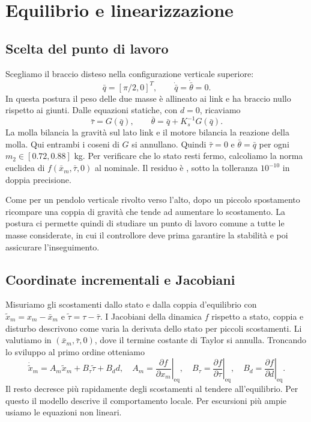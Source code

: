 \chapter{Equilibrio e linearizzazione}
\section{Scelta del punto di lavoro}
Scegliamo il braccio disteso nella configurazione verticale superiore:
\[
 \bar q=[\pi/2,0]^T,\qquad \dot{\bar q}=\dot{\bar\theta}=0.
\]
In questa postura il peso delle due masse è allineato ai link e ha
braccio nullo rispetto ai giunti. Dalle equazioni statiche, con
$d=0$, ricaviamo
\[
 \bar\tau=G(\bar q),\qquad \bar\theta=\bar q+K_s^{-1}G(\bar q).
\]
La molla bilancia la gravità sul lato link e il motore bilancia
la reazione della molla. Qui entrambi i coseni di $G$ si annullano.
Quindi $\bar\tau=0$ e $\bar\theta=\bar q$ per ogni
$m_2\in[0.72,0.88]$ kg. Per verificare che lo stato resti fermo,
calcoliamo la norma euclidea di $f(\bar x_m,\bar\tau,0)$ al
nominale. Il residuo è \FinResiduoEquilibrio, sotto la tolleranza
$10^{-10}$ in doppia precisione.

Come per un pendolo verticale rivolto verso l'alto, dopo un piccolo
spostamento ricompare una coppia di gravità che tende ad aumentare
lo scostamento. La postura ci permette quindi di studiare un punto di
lavoro comune a tutte le masse considerate, in cui il controllore
deve prima garantire la stabilità e poi assicurare l'inseguimento.

\section{Coordinate incrementali e Jacobiani}
Misuriamo gli scostamenti dallo stato e dalla coppia d'equilibrio
con $\widetilde x_m=x_m-\bar x_m$ e
$\widetilde\tau=\tau-\bar\tau$. I Jacobiani della dinamica $f$
rispetto a stato, coppia e disturbo descrivono come varia la derivata
dello stato per piccoli scostamenti. Li valutiamo in
$(\bar x_m,\bar\tau,0)$, dove il termine costante di Taylor si annulla.
Troncando lo sviluppo al primo ordine otteniamo
\[
 \dot{\widetilde x}_m=A_m\widetilde x_m+B_\tau\widetilde\tau+B_dd,
 \quad
 A_m=\left.\frac{\partial f}{\partial x_m}\right|_{\mathrm{eq}},
 \quad B_\tau=\left.\frac{\partial f}{\partial\tau}\right|_{\mathrm{eq}},
 \quad B_d=\left.\frac{\partial f}{\partial d}\right|_{\mathrm{eq}}.
\]
Il resto decresce più rapidamente degli scostamenti al tendere
all'equilibrio. Per questo il modello descrive il comportamento locale.
Per escursioni più ampie usiamo le equazioni non lineari.

